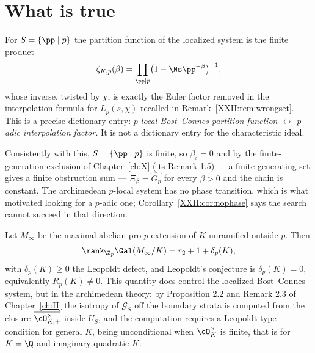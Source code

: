 \section{What is true}\label{XXII:sec:true}

\begin{proposition}\label{XXII:prop:euler}
For $S=\{\pp\mid p\}$ the partition function of the localized system is the finite product
\[
\zeta_{K,p}(\beta)=\prod_{\pp\mid p}\bigl(1-\Ns\pp^{-\beta}\bigr)^{-1},
\]
whose inverse, twisted by $\chi$, is exactly the Euler factor removed in the interpolation
formula for $L_p(s,\chi)$ recalled in Remark~\ref{XXII:rem:wrongset}. This is a precise
dictionary entry: \emph{$p$-local Bost--Connes partition function $\leftrightarrow$ $p$-adic
interpolation factor.} It is not a dictionary entry for the characteristic ideal.
\end{proposition}

\begin{remark}\label{XXII:rem:finiteS}
Consistently with this, $S=\{\pp\mid p\}$ is finite, so $\beta_c=0$ and by
the finite-generation exclusion of Chapter~\ref{ch:X} (its Remark 1.5) --- a finite generating set gives a finite obstruction sum ---
$\Xi_\beta=\widehat{G_p}$ for every $\beta>0$ and the chain is constant. The archimedean
$p$-local system has no phase transition, which is what motivated looking for a $p$-adic one;
Corollary~\ref{XXII:cor:nophase} says the search cannot succeed in that direction.
\end{remark}

\begin{proposition}\label{XXII:prop:leopoldt}
Let $M_\infty$ be the maximal abelian pro-$p$ extension of $K$ unramified outside $p$. Then
\[
\rank_{\Z_p}\Gal(M_\infty/K)=r_2+1+\delta_p(K),
\]
with $\delta_p(K)\ge0$ the Leopoldt defect, and Leopoldt's conjecture is $\delta_p(K)=0$,
equivalently $R_p(K)\ne0$. This quantity does control the localized Bost--Connes system, but
in the archimedean theory: by Proposition 2.2 and Remark 2.3 of Chapter~\ref{ch:II} the isotropy of $\mathcal G_S$ off
the boundary strata is computed from the closure $\overline{\cO^\times_{K,+}}$ inside
$U_S$, and the computation requires a Leopoldt-type condition for general $K$, being
unconditional when $\cO_K^\times$ is finite, that is for $K=\Q$ and imaginary quadratic $K$.
\end{proposition}

